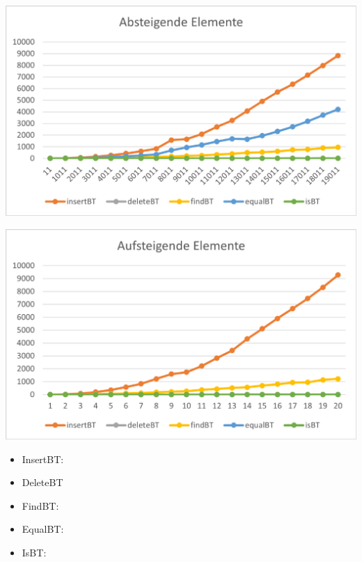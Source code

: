 \documentclass[11pt]{article}
\begin{document}
    \begin{center}
        \includegraphics[width=0.9\columnwidth] {ZeitAb.pdf}
    \end{center}
    \begin{center}
        \includegraphics[width=0.9\columnwidth] {ZeitAuf.pdf}
    \end{center}

    \begin{itemize}
        \item InsertBT:

        \item DeleteBT

        \item FindBT:

        \item EqualBT:

        \item IsBT:
    \end{itemize}
\end{document}
